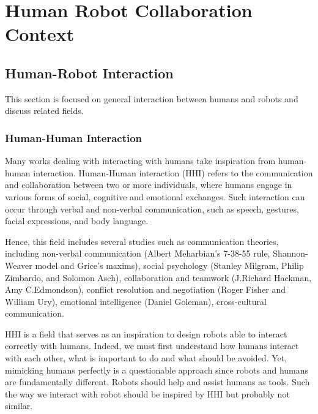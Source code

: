 \ifdefined{}
\else
\setcounter{chapter}{0}
\dominitoc
\faketableofcontents
\fi

\chapter{Human Robot Collaboration Context}
\label{chap:1}
\minitoc



\section{Human-Robot Interaction}

This section is focused on general interaction between humans and robots and discuss related fields.

\subsection{Human-Human Interaction}

Many works dealing with interacting with humans take inspiration from human-human interaction. Human-Human interaction (HHI) refers to the communication and collaboration between two or more individuals, where humans engage in various forms of social, cognitive and emotional exchanges. Such interaction can occur through verbal and non-verbal communication, such as speech, gestures, facial expressions, and body language.

Hence, this field includes several studies such as communication theories, including non-verbal communication (Albert Meharbian's 7-38-55 rule, Shannon-Weaver model and Grice's maxims), social psychology (Stanley Milgram, Philip Zimbardo, and Solomon Asch), collaboration and teamwork (J.Richard Hackman, Amy C.Edmondson), conflict resolution and negotiation (Roger Fisher and William Ury), emotional intelligence (Daniel Goleman), cross-cultural communication.

HHI is a field that serves as an inspiration to design robots able to interact correctly with humans. Indeed, we must first understand how humans interact with each other, what is important to do and what should be avoided. Yet, mimicking humans perfectly is a questionable approach since robots and humans are fundamentally different. Robots should help and assist humans as tools. Such the way we interact with robot should be inspired by HHI but probably not similar.


